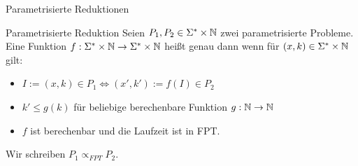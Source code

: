 \documentclass[navbaroff]{sdqbeamer}
\begin{document}
\begin{frame}[t]{Parametrisierte Reduktionen}
    \begin{blueblock}{Parametrisierte Reduktion}
        Seien $P_1, P_2 \in \Sigma^* \times \mathbb{N}$ zwei parametrisierte Probleme.
        \\
        Eine Funktion $f: \Sigma^* \times \mathbb{N} \rightarrow \Sigma^* \times \mathbb{N}$ heißt genau dann  wenn
        für $(x, k) \in \Sigma^* \times \mathbb{N}$ gilt:
        \begin{itemize}
            \item $I:=(x, k) \in P_1 \iff (x', k') := f(I) \in P_2$
            \item $k' \leq g(k)$ für beliebige berechenbare Funktion $g: \mathbb{N} \rightarrow \mathbb{N}$
            \item $f$ ist berechenbar und die Laufzeit ist in FPT.
        \end{itemize}
        \vspace{10pt}
        Wir schreiben $P_1 \propto_{FPT} P_2$.
    \end{blueblock}
\end{frame}
\end{document}
